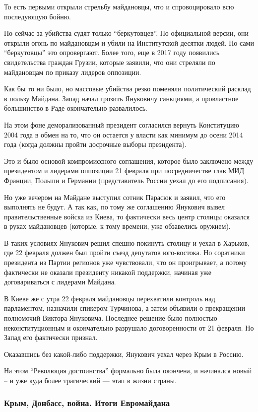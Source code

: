 То есть первыми открыли стрельбу майдановцы, что и спровоцировало всю
последующую бойню.

Но сейчас за убийства судят только \enquote{беркутовцев}. По официальной версии,
они открыли огонь по майдановцам и убили на Институтской десятки людей. Но
сами \enquote{беркутовцы} это опровергают. Более того, еще в 2017 году появились
свидетельства граждан Грузии, которые заявили, что они стреляли по
майдановцам по приказу лидеров оппозиции. 

Как бы то ни было, но массовые убийства резко поменяли политический
расклад в пользу Майдана. Запад начал грозить Януковичу санкциями, а
провластное большинство в Раде окончательно развалилось.

На этом фоне деморализованный президент согласился вернуть Конституцию
2004 года в обмен на то, что он остается у власти как минимум до осени
2014 года (когда должны пройти досрочные выборы президента).

Это и было основой компромиссного соглашения, которое было заключено между
президентом и лидерами оппозиции 21 февраля при посредничестве глав МИД
Франции, Польши и Германии (представитель России уехал до его подписания).

Но уже вечером на Майдане выступил сотник Парасюк и заявил, что его
выполнять не будут. А так как, по тому же соглашению Янукович вывел
правительственные войска из Киева, то фактически весь центр столицы
оказался в руках майдановцев (которые, к тому времени, уже обзавелись
оружием). 

В таких условиях Янукович решил спешно покинуть столицу и уехал в Харьков,
где 22 февраля должен был пройти съезд депутатов юго-востока. Но соратники
президента из Партии регионов уже чувствовали, что он проигрывает, а
потому фактически не оказали президенту никакой поддержки, начиная уже
договариваться с лидерами Майдана.

В Киеве же с утра 22 февраля майдановцы перехватили контроль над
парламентом, назначили спикером Турчинова, а затем объявили о прекращении
полномочий Виктора Януковича. Последнее решение было полностью
неконституционным и окончательно разрушало договоренности от 21 февраля.
Но Запад его фактически признал.

Оказавшись без какой-либо поддержки, Янукович уехал через Крым в Россию. 

На этом \enquote{Революция достоинства} формально была окончена, и начинался новый
– и уже куда более трагический --- этап в жизни страны. 

\subsubsection{Крым, Донбасс, война. Итоги Евромайдана}

